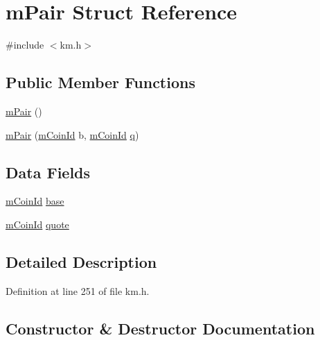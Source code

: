 \hypertarget{struct_k_1_1m_pair}{}\section{m\+Pair Struct Reference}
\label{struct_k_1_1m_pair}


{\ttfamily \#include $<$km.\+h$>$}

\subsection*{Public Member Functions}
\begin{DoxyCompactItemize}
\item 
\hyperlink{struct_k_1_1m_pair_a1d94c6e5fb7ac6b74c3b886ef535ad36}{m\+Pair} ()
\item 
\hyperlink{struct_k_1_1m_pair_a9f3d32f3fdf994034c03e8aaa05d58c7}{m\+Pair} (\hyperlink{km_8h_a0299927fb26276a1e0f4c2b4dedb698e}{m\+Coin\+Id} b, \hyperlink{km_8h_a0299927fb26276a1e0f4c2b4dedb698e}{m\+Coin\+Id} \hyperlink{namespace_k_a211862d8b09ec46a051464b6859c1306a7694f4a66316e53c8cdd9d9954bd611d}{q})
\end{DoxyCompactItemize}
\subsection*{Data Fields}
\begin{DoxyCompactItemize}
\item 
\hyperlink{km_8h_a0299927fb26276a1e0f4c2b4dedb698e}{m\+Coin\+Id} \hyperlink{struct_k_1_1m_pair_a88838a75375332fd734e38ba4d7d870c}{base}
\item 
\hyperlink{km_8h_a0299927fb26276a1e0f4c2b4dedb698e}{m\+Coin\+Id} \hyperlink{struct_k_1_1m_pair_abb05d77de0b838cdc580fe5759070aad}{quote}
\end{DoxyCompactItemize}


\subsection{Detailed Description}


Definition at line 251 of file km.\+h.



\subsection{Constructor \& Destructor Documentation}
